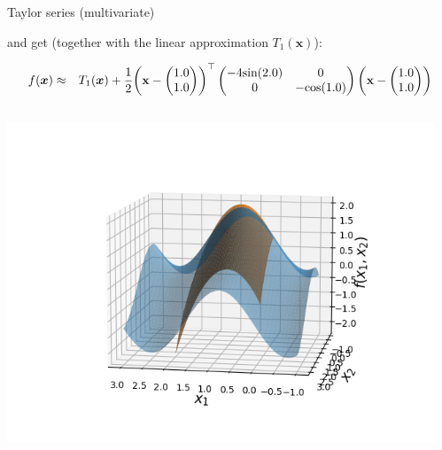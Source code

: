 \begin{vbframe}{Taylor series (multivariate)}
\begin{footnotesize}
  and get (together with the linear approximation $T_1(\bm{x})$):
  \vspace*{-0.2cm}
  
  
  \begin{eqnarray*}
    f(\bm{x}) &\approx& T_1(\bm{x}) + \frac{1}{2}\biggl(\mathbf{x}- \begin{pmatrix}1.0 \\ 1.0 \end{pmatrix}\biggr)^\top \begin{pmatrix} -4 \text{sin}(2.0) & 0 \\ 0 & -\text{cos}(1.0) \end{pmatrix} \biggl(\mathbf{x}- \begin{pmatrix}1.0 \\ 1.0 \end{pmatrix}\biggr)
  \end{eqnarray*}
  \vspace*{-0.2cm}
  \end{footnotesize}
  \begin{columns}
    \begin{column}{0.48\textwidth}
      \includegraphics[width = \textwidth]{figure_man/Taylor2D/Taylor2D_2nd-100.png}
    \end{column}
    \begin{column}{0.48\textwidth}

\end{column}
\end{columns}
\end{vbframe}
